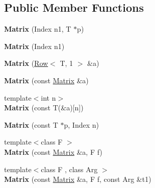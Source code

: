 \subsection*{Public Member Functions}
\begin{DoxyCompactItemize}
\item 
{\bfseries Matrix} (Index n1, T $\ast$p)\hypertarget{classcpt_1_1Matrix_3_01T_00_011_01_4_a63c2dc4463cf03015f88828d09042445}{}\label{classcpt_1_1Matrix_3_01T_00_011_01_4_a63c2dc4463cf03015f88828d09042445}

\item 
{\bfseries Matrix} (Index n1)\hypertarget{classcpt_1_1Matrix_3_01T_00_011_01_4_acca5d708a4653ff17dcaeae4dd7da07f}{}\label{classcpt_1_1Matrix_3_01T_00_011_01_4_acca5d708a4653ff17dcaeae4dd7da07f}

\item 
{\bfseries Matrix} (\hyperlink{classcpt_1_1Row}{Row}$<$ T, 1 $>$ \&a)\hypertarget{classcpt_1_1Matrix_3_01T_00_011_01_4_a36834a663ca8f57e790d9eb7d4589379}{}\label{classcpt_1_1Matrix_3_01T_00_011_01_4_a36834a663ca8f57e790d9eb7d4589379}

\item 
{\bfseries Matrix} (const \hyperlink{classcpt_1_1Matrix}{Matrix} \&a)\hypertarget{classcpt_1_1Matrix_3_01T_00_011_01_4_a360820c44b393bd88331b6ac57dc8d63}{}\label{classcpt_1_1Matrix_3_01T_00_011_01_4_a360820c44b393bd88331b6ac57dc8d63}

\item 
{\footnotesize template$<$int n$>$ }\\{\bfseries Matrix} (const T(\&a)\mbox{[}n\mbox{]})\hypertarget{classcpt_1_1Matrix_3_01T_00_011_01_4_a286bd00da5b027232115f0632d032475}{}\label{classcpt_1_1Matrix_3_01T_00_011_01_4_a286bd00da5b027232115f0632d032475}

\item 
{\bfseries Matrix} (const T $\ast$p, Index n)\hypertarget{classcpt_1_1Matrix_3_01T_00_011_01_4_adf57616621d9a9eeae49357d9128e6e9}{}\label{classcpt_1_1Matrix_3_01T_00_011_01_4_adf57616621d9a9eeae49357d9128e6e9}

\item 
{\footnotesize template$<$class F $>$ }\\{\bfseries Matrix} (const \hyperlink{classcpt_1_1Matrix}{Matrix} \&a, F f)\hypertarget{classcpt_1_1Matrix_3_01T_00_011_01_4_adc99eca607871c837a2650163503be9a}{}\label{classcpt_1_1Matrix_3_01T_00_011_01_4_adc99eca607871c837a2650163503be9a}

\item 
{\footnotesize template$<$class F , class Arg $>$ }\\{\bfseries Matrix} (const \hyperlink{classcpt_1_1Matrix}{Matrix} \&a, F f, const Arg \&t1)\hypertarget{classcpt_1_1Matrix_3_01T_00_011_01_4_a7cbd1070f21693e763b6643cc5b94d24}{}\label{classcpt_1_1Matrix_3_01T_00_011_01_4_a7cbd1070f21693e763b6643cc5b94d24}


\end{DoxyCompactItemize}

